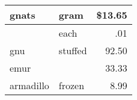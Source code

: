 \documentclass{article}
\begin{document}
\setcounter{equation}{0}
\begin{tabular}{||l|lr||}
\hline
gnats     & gram    & \$13.65 \\
\hline
          & each    &     .01 \\
\hline
gnu       & stuffed &   92.50 \\
\cline{1-1} \cline{3-3}
emur      &         &   33.33 \\
armadillo & frozen  &    8.99 \\
\hline
\end{tabular}
\end{document}
